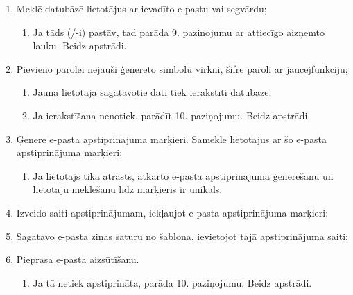 {\begin{enumerate}
\begin{enumerate}
			      \item Ja tika iesniegts attēls, tad pārbauda, vai datne atbilst pieļaujamajiem datnes paplašinājumiem;
			      \item Ja neatbilst, parāda 7. paziņojumu ar atļautiem datnes paplašinājumiem. Beidz apstrādi.
			      \item Ja tika iesniegts attēls, tad pārbauda, vai datne nepārsniedz noteikto datnes lielumu;
			      \item Ja pārsniedz, parāda 8. paziņojumu ar iesniegtās datnes lielumu un maksimāli atļauto datnes lielumu. Beidz apstrādi.
			      \item Ja iesniegtā attēla paplašinājums nav PNG, tad datne tiek konvertēta šajā paplašinājumā.
		      \end{enumerate}
		\item Meklē datubāzē lietotājus ar ievadīto e-pastu vai segvārdu;
		      \begin{enumerate}
			      \item Ja tāds (/-i) pastāv, tad parāda 9. paziņojumu ar attiecīgo
			            aizņemto lauku. Beidz apstrādi.
		      \end{enumerate}
		\item Pievieno parolei nejauši ģenerēto simbolu virkni, šifrē paroli ar jaucējfunkciju;
		      \begin{enumerate}
			      \item Jauna lietotāja sagatavotie dati tiek ierakstīti datubāzē;
			      \item Ja ierakstīšana nenotiek, parādīt 10. paziņojumu. Beidz apstrādi.
		      \end{enumerate}
		\item Ģenerē e-pasta apstiprinājuma marķieri. Sameklē lietotājus ar šo e-pasta apstiprinājuma marķieri;
		      \begin{enumerate}
			      \item Ja lietotājs tika atrasts, atkārto e-pasta apstiprinājuma ģenerēšanu un
			            lietotāju meklēšanu līdz marķieris ir unikāls.
		      \end{enumerate}
		\item Izveido saiti apstiprinājumam, iekļaujot e-pasta apstiprinājuma marķieri;
		\item Sagatavo e-pasta ziņas saturu no šablona, ievietojot tajā apstiprinājuma saiti;
		\item Pieprasa e-pasta aizsūtīšanu.
		      \begin{enumerate}
			      \item Ja tā netiek apstiprināta, parāda 10. paziņojumu. Beidz apstrādi.
		      \end{enumerate}
	\end{enumerate}
}

